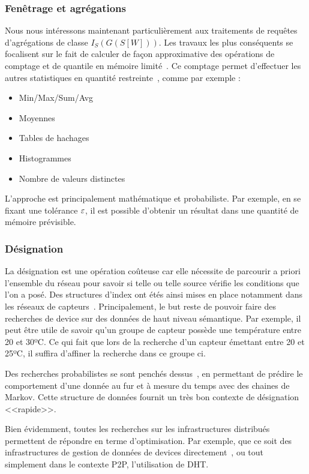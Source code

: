 \subsubsection{Fenêtrage et agrégations}
Nous nous intéressons maintenant particulièrement aux traitements de requêtes d'agrégations de classe $I_S(G(S[W]))$. Les travaux les plus conséquents se focalisent sur le fait de calculer de façon approximative des opérations de comptage et de quantile en mémoire limité~\cite{Arasu:window}. Ce comptage permet d'effectuer les autres statistiques en quantité restreinte~\cite{Datar:stats}, comme par exemple : 
\begin{itemize}
 \item Min/Max/Sum/Avg 
 \item Moyennes
 \item Tables de hachages
 \item Histogrammes
 \item Nombre de valeurs distinctes
\end{itemize}

L'approche est principalement mathématique et probabiliste. Par exemple, en se fixant une tolérance $\varepsilon$, il est possible d'obtenir un résultat dans une quantité de mémoire prévisible.

\subsubsection{Désignation}
La désignation est une opération coûteuse car elle nécessite de parcourir a priori l'ensemble du réseau pour savoir si telle ou telle source vérifie les conditions que l'on a posé. Des structures d'index ont étés ainsi mises en place notamment dans les réseaux de capteurs~\cite{Greenstein:difs}. Principalement, le but reste de pouvoir faire des recherches de device sur des données de haut niveau sémantique. Par exemple, il peut être utile de savoir qu'un groupe de capteur possède une température entre 20 et 30ºC. Ce qui fait que lors de la recherche d'un capteur émettant entre 20 et 25ºC, il suffira d'affiner la recherche dans ce groupe ci. 

Des recherches probabilistes se sont penchés dessus~\cite{Bhattacharya:mist}, en permettant de prédire le comportement d'une donnée au fur et à mesure du temps avec des chaines de Markov. Cette structure de données fournit un très bon contexte de désignation <<rapide>>.

Bien évidemment, toutes les recherches sur les infrastructures distribués permettent de répondre en terme d'optimisation. Par exemple, que ce soit des infrastructures de gestion de données de devices directement~\cite{Gurgen:sstreamware}, ou tout simplement dans le contexte P2P, l'utilisation de DHT.
